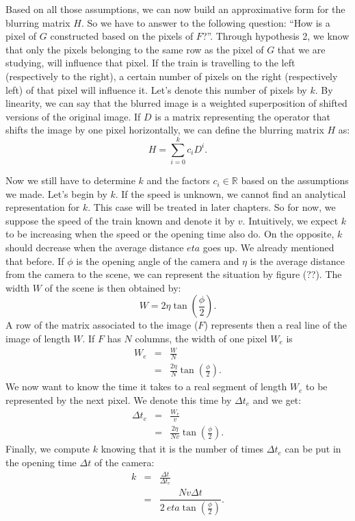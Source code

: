 Based on all those assumptions, we can now build an approximative form for the blurring matrix $H$. So we have to answer to the following question: ``How is a pixel of $G$ constructed based on the pixels of $F$?''. Through hypothesis 2, we know that only the pixels belonging to the same row as the pixel of $G$ that we are studying, will influence that pixel. If the train is travelling to the left (respectively to the right), a certain number of pixels on the right (respectively left) of that pixel will influence it. Let's denote this number of pixels by $k$. By linearity, we can say that the blurred image is a weighted superposition of shifted versions of the original image. If $D$ is a matrix representing the operator that shifts the image by one pixel horizontally, we can define the blurring matrix $H$ as:
\begin{equation}
H=\sum_{i=0}^{k} c_i D^{i}.
\label{eqHtrain}
\end{equation}

Now we still have to determine $k$ and the factors $c_i \in \mathbb{R}$ based on the assumptions we made. Let's begin by $k$. If the speed is unknown, we cannot find an analytical representation for $k$. This case will be treated in later chapters. So for now, we suppose the speed of the train known and denote it by $v$. Intuitively, we expect $k$ to be increasing when the speed or the opening time also do. On the opposite, $k$ should decrease when the average distance $eta$ goes up. We already mentioned that before. If $\phi$ is the opening angle of the camera and $\eta$ is the average distance from the camera to the scene, we can represent the situation by figure (??). The width $W$ of the scene is then obtained by: %
\begin{equation}
W = 2 \eta \tan\left(\frac{\phi}{2}\right).
\end{equation}
A row of the matrix associated to the image ($F$) represents then a real line of the image of length $W$. If $F$ has $N$ columns, the width of one pixel $W_e$ is
\begin{eqnarray}
W_e &=& \frac{W}{N} \\
&=& \frac{2 \eta }{N}\tan\left(\frac{\phi}{2}\right).
\end{eqnarray}
We now want to know the time it takes to a real segment of length $W_e$ to be represented by the next pixel. We denote this time by $\Delta t_e$ and we get:
\begin{eqnarray}
\Delta t_e &=&\frac{W_e}{v}\\
&=& \frac{2 \eta }{Nv}\tan\left(\frac{\phi}{2}\right).
\end{eqnarray}
Finally, we compute $k$ knowing that it is the number of times $\Delta t_e$ can be put in the opening time $\Delta t$ of the camera:
\begin{eqnarray}
k &=& \frac{\Delta t}{\Delta t _e} \\
&=& \dfrac{Nv\Delta t}{2 \ eta \tan\left(\frac{\phi}{2}\right)}.
\end{eqnarray}


